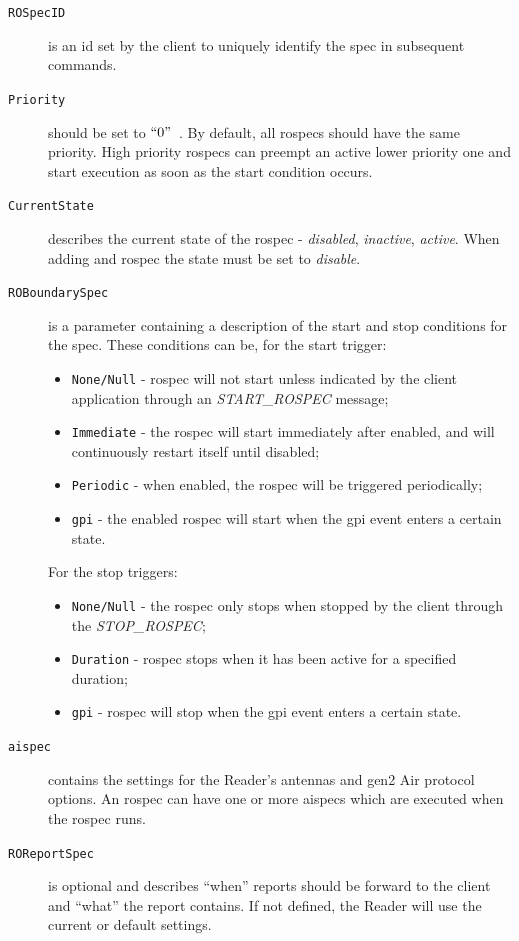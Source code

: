 \begin{description}

\item[\texttt{ROSpecID}] is an \ac{id} set by the client to uniquely identify the \ac{spec} in subsequent commands.

\item[\texttt{Priority}] should be set to $``0"$~\cite{ImpinjLTKProgrammers}. By default, all \acp{rospec} should have the same priority. High priority \acp{rospec} can preempt an active lower priority one and start execution as soon as the start condition occurs.

\item[\texttt{CurrentState}] describes the current state of the \ac{rospec} - \emph{disabled}, \emph{inactive}, \emph{active}. When adding and \ac{rospec} the state must be set to \emph{disable}.

\item[\texttt{ROBoundarySpec}] is a parameter containing a description of the start and stop conditions for the \ac{spec}. 
These conditions can be, for the start trigger:
\begin{itemize}
    \item \texttt{None/Null} - \ac{rospec} will not start unless indicated by the client application through an \textit{START\_ROSPEC} message;
    \item \texttt{Immediate} - the \ac{rospec} will start immediately after enabled, and will continuously restart itself until disabled;
    \item \texttt{Periodic} - when enabled, the \ac{rospec} will be triggered periodically;
    \item \texttt{\ac{gpi}} - the enabled \ac{rospec} will start when the \ac{gpi} event enters a certain state.
\end{itemize}

For the stop triggers:
\begin{itemize}
    \item \texttt{None/Null} - the \ac{rospec} only stops when stopped by the client through the \textit{STOP\_ROSPEC};
    \item \texttt{Duration} - \ac{rospec} stops when it has been active for a specified duration;
    \item \texttt{\ac{gpi}} - \ac{rospec} will stop when the \ac{gpi} event enters a certain state.
\end{itemize}

\item[\texttt{\ac{aispec}}] contains the settings for the Reader's antennas and \ac{gen2} Air protocol options. An \ac{rospec} can have one or more \acp{aispec} which are executed when the \ac{rospec} runs.

\item[\texttt{ROReportSpec}] is optional and describes ``when'' reports should be forward to the client and ``what'' the report contains. If not defined, the Reader will use the current or default settings.
\end{description}

